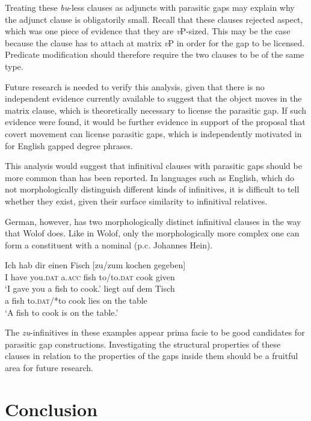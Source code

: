\documentclass[output=paper]{langscibook}
\begin{document}
Treating these \emph{bu}-less clauses as adjuncts with parasitic gaps may explain why the adjunct clause is obligatorily small. Recall that these clauses rejected aspect, which was one piece of evidence that they are \textit{v}P-sized. This may be the case because the clause has to attach at matrix \textit{v}P in order for the gap to be licensed. Predicate modification should therefore require the two clauses to be of the same type.

Future research is needed to verify this analysis, given that there is no independent evidence currently available to suggest that the object moves in the matrix clause, which is theoretically necessary to license the parasitic gap. If such evidence were found, it would be further evidence in support of the proposal that covert movement can license parasitic gaps, which is independently motivated in \citet{nissenbaumschwarz:2010} for English gapped degree phrases. 

This analysis would suggest that infinitival clauses with parasitic gaps should be more common than has been reported. In languages such as English, which do not morphologically distinguish different kinds of infinitives, it is difficult to tell whether they exist, given their surface similarity to infinitival relatives. 

German, however, has two morphologically distinct infinitival clauses in the way that Wolof does. Like in Wolof, only the morphologically more complex one can form a constituent with a nominal (p.c. Johannes Hein). 

\begin{exe}
	\ex
	\gll Ich hab dir einen Fisch [zu/zum kochen gegeben]\\
	I have you.\textsc{dat} a.\textsc{acc} fish to/to.\textsc{dat} cook given\\
	\trans `I gave you a fish to cook.'
	\ex
	 liegt auf dem Tisch \\
	a fish to.\textsc{dat}/*to cook lies on the table\\
	\trans `A fish to cook is on the table.'
\end{exe}

The \emph{zu}-infinitives in these examples appear prima facie to be good candidates for parasitic gap constructions. Investigating the structural properties of these clauses in relation to the properties of the gaps inside them should be a fruitful area for future research.

\section{Conclusion} \label{sec:newman:conc}
\end{document}

